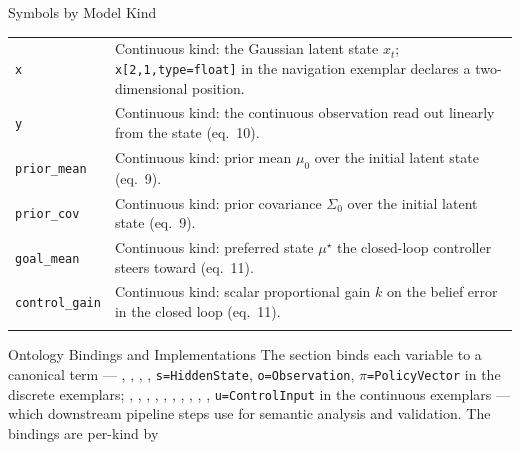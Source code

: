 \documentclass[
  ignorenonframetext,
]{beamer}
\begin{document}
\begin{frame}{Symbols by Model Kind}
\begin{longtable}[]{@{}
  >{\raggedright\arraybackslash}p{}
  >{\raggedright\arraybackslash}p{}@{}}
\texttt{x} & Continuous kind: the Gaussian latent state \(x_t\);
\texttt{x{[}2,1,type=float{]}} in the navigation exemplar declares a
two-dimensional position. \\
\texttt{y} & Continuous kind: the continuous observation read out
linearly from the state (eq.~10). \\
\texttt{prior\_mean} & Continuous kind: prior mean \(\mu_0\) over the
initial latent state (eq.~9). \\
\texttt{prior\_cov} & Continuous kind: prior covariance \(\Sigma_0\)
over the initial latent state (eq.~9). \\
\texttt{goal\_mean} & Continuous kind: preferred state \(\mu^\star\) the
closed-loop controller steers toward (eq.~11). \\
\texttt{control\_gain} & Continuous kind: scalar proportional gain \(k\)
on the belief error in the closed loop (eq.~11). \\
\bottomrule\noalign{}
\end{longtable}
\end{frame}

\begin{frame}{Ontology Bindings and
Implementations}
\protect{}\label{ontology-bindings-and-implementations}
The  section binds each variable
to a canonical term --- ,
, ,
, \texttt{s=HiddenState},
\texttt{o=Observation}, \texttt{\texorpdfstring{\ensuremath{\pi}}{pi}=PolicyVector} in the discrete
exemplars; ,
, ,
, ,
, ,
, ,
, \texttt{u=ControlInput} in the
continuous exemplars --- which downstream pipeline steps use for
semantic analysis and validation. The bindings are per-kind by
\end{frame}
\end{document}
